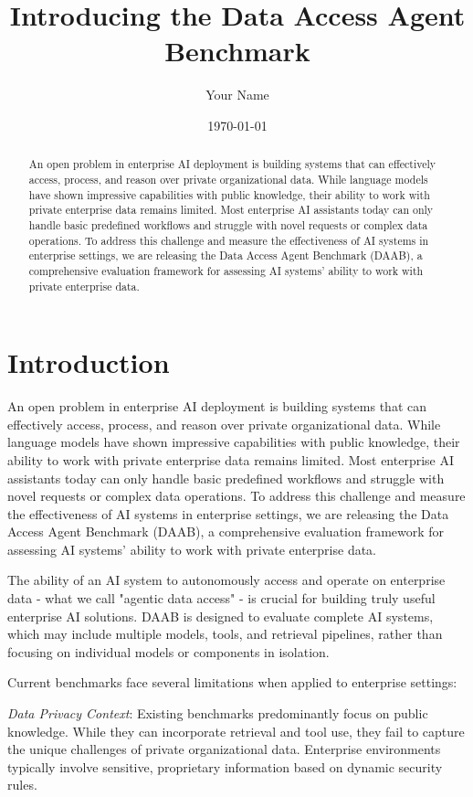 \documentclass[11pt,a4paper]{article}
\title{Introducing the Data Access Agent Benchmark}
\author{Your Name}
\date{\today}
\begin{document}
\maketitle

\begin{abstract}
An open problem in enterprise AI deployment is building systems that can effectively access, process, and reason over private organizational data. While language models have shown impressive capabilities with public knowledge, their ability to work with private enterprise data remains limited. Most enterprise AI assistants today can only handle basic predefined workflows and struggle with novel requests or complex data operations. To address this challenge and measure the effectiveness of AI systems in enterprise settings, we are releasing the Data Access Agent Benchmark (DAAB), a comprehensive evaluation framework for assessing AI systems' ability to work with private enterprise data.
\end{abstract}

\section{Introduction}
An open problem in enterprise AI deployment is building systems that can effectively access, process, and reason over private organizational data. While language models have shown impressive capabilities with public knowledge, their ability to work with private enterprise data remains limited. Most enterprise AI assistants today can only handle basic predefined workflows and struggle with novel requests or complex data operations. To address this challenge and measure the effectiveness of AI systems in enterprise settings, we are releasing the Data Access Agent Benchmark (DAAB), a comprehensive evaluation framework for assessing AI systems' ability to work with private enterprise data. 

The ability of an AI system to autonomously access and operate on enterprise data - what we call "agentic data access" - is crucial for building truly useful enterprise AI solutions. DAAB is designed to evaluate complete AI systems, which may include multiple models, tools, and retrieval pipelines, rather than focusing on individual models or components in isolation. 

Current benchmarks face several limitations when applied to enterprise settings: 

\textit{Data Privacy Context}: Existing benchmarks predominantly focus on public knowledge. While they can incorporate retrieval and tool use, they fail to capture the unique challenges of private organizational data. Enterprise environments typically involve sensitive, proprietary information based on dynamic security rules.
\end{document}
